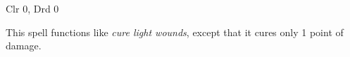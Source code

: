 
\begin{description*}
\item[Level:] Clr 0, Drd 0
\end{description*}

This spell functions like \textit{cure light wounds}, except that it cures only
1 point of damage.